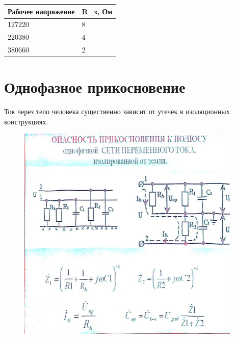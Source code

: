 \documentclass[a4paper, 14pt]{extarticle}
\begin{document}
\begin{table}[h]
\centering
\begin{tabular}{@{}ll@{}}
\toprule
Рабочее напряжение & R\_з, Ом \\ \midrule
127220             & 8        \\
220380             & 4        \\
380660             & 2       \\
\bottomrule
\end{tabular}
\end{table}

\section{Однофазное прикосновение}
Ток через тело человека существенно зависит от утечек в изоляционных конструкциях.
\begin{figure}[h]
    \centering
    \includegraphics[width=0.95\textwidth]{./img/L3/S001.jpg}
\end{figure}
\end{document}
